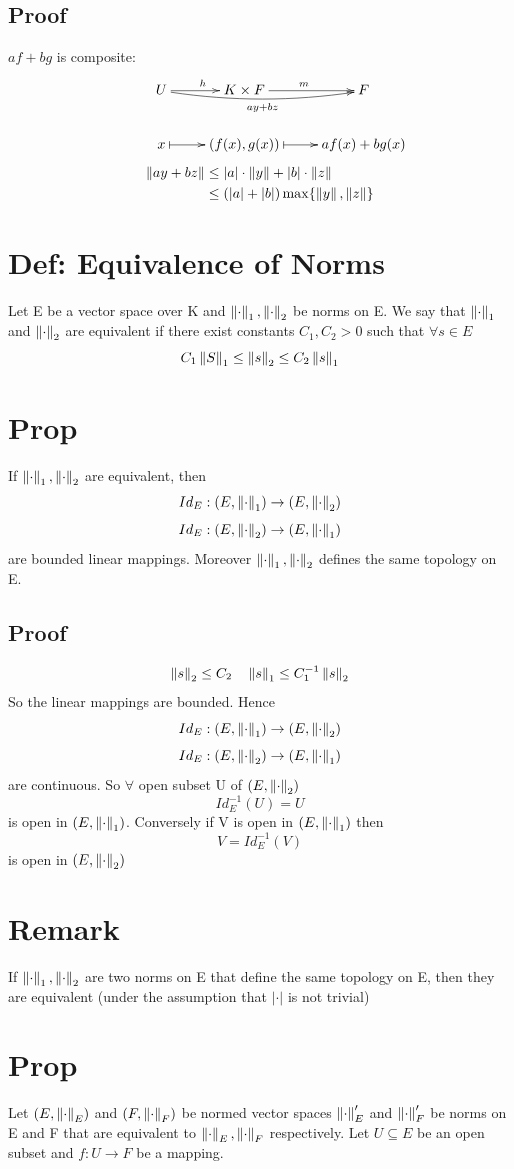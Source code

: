 \documentclass{book}
\begin{document}
\subsection*{Proof}
$af+bg$ is composite:
$$
\xymatrix{
    & U \ar@/_/[rr]_{ay+bz}\ar[r]^h &K\times F\ar[r]^m &F \\
    & x \ar@{|->}[r] &(f(x),g(x))\ar@{|->}[r] &af(x)+bg(x)
}$$
$$\begin{aligned}
\left\lVert ay+bz \right\rVert &\leq\lvert a\rvert\cdot\left\lVert y \right\rVert+\lvert b\rvert\cdot\left\lVert z \right\rVert\\
&\leq(\lvert a\rvert+\lvert b\rvert)\max\{\left\lVert y \right\rVert,\left\lVert z \right\rVert\}
\end{aligned}$$
\section{Def: Equivalence of Norms}
Let E be a vector space over K and $\left\lVert \cdot \right\rVert_1,\left\lVert \cdot \right\rVert_2$ be norms on E. We say that $\left\lVert \cdot \right\rVert_1$ and $\left\lVert \cdot \right\rVert_2$ are equivalent if there exist constants $C_1,C_2>0$ such that $\forall s\in E$$$C_1\left\lVert S \right\rVert_1\leq\left\lVert s \right\rVert_2\leq C_2\left\lVert s \right\rVert_1$$
\section{Prop}
If $\left\lVert \cdot \right\rVert_1,\left\lVert \cdot \right\rVert_2$ are equivalent, then $$Id_E:(E,\left\lVert \cdot \right\rVert_1)\rightarrow(E,\left\lVert \cdot \right\rVert_2)$$
$$Id_E:(E,\left\lVert \cdot \right\rVert_2)\rightarrow(E,\left\lVert \cdot \right\rVert_1)$$ are bounded linear mappings. Moreover $\left\lVert \cdot \right\rVert_1,\left\lVert \cdot \right\rVert_2$ defines the same topology on E.
\subsection*{Proof}
$$\left\lVert s \right\rVert_2\leq C_2\quad \left\lVert s \right\rVert_1\leq C_1^{-1}\left\lVert s \right\rVert_2$$
So the linear mappings are bounded. Hence $$Id_E:(E,\left\lVert \cdot \right\rVert_1)\rightarrow(E,\left\lVert \cdot \right\rVert_2)$$
$$Id_E:(E,\left\lVert \cdot \right\rVert_2)\rightarrow(E,\left\lVert \cdot \right\rVert_1)$$
are continuous. So $\forall$ open subset U of $(E,\left\lVert \cdot \right\rVert_2)$
$$Id_E^{-1}(U)=U$$ is open in $(E,\left\lVert \cdot \right\rVert_1)$. Conversely if V is open in $(E,\left\lVert \cdot \right\rVert_1)$ then $$V=Id_E^{-1}(V)$$ is open in $(E,\left\lVert \cdot \right\rVert_2)$
\section{Remark}
If $\left\lVert \cdot \right\rVert_1,\left\lVert \cdot \right\rVert_2$ are two norms on E that define the same topology on E, then they are equivalent (under the assumption that $\lvert\cdot\rvert$ is not trivial)
\section{Prop}
Let $(E,\left\lVert \cdot \right\rVert_E)$ and $(F,\left\lVert \cdot \right\rVert_F)$ be normed vector spaces $\left\lVert \cdot \right\rVert'_E$ and $\left\lVert \cdot \right\rVert'_F$ be norms on E and F that are equivalent to $\left\lVert \cdot \right\rVert_E,\left\lVert \cdot \right\rVert_F$ respectively. Let $U\subseteq E$ be an open subset and $f:U\rightarrow F$ be a mapping.
\end{document}

